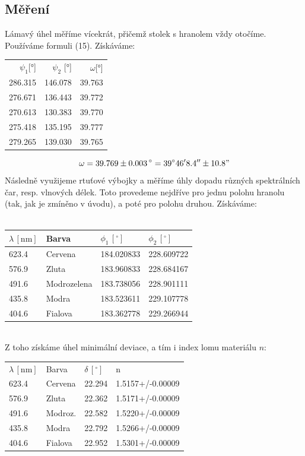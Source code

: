\documentclass[czech,11pt,a4paper]{article}
\begin{document}
\begin{multicols}{2}
	
		\section{Měření}
		Lámavý úhel měříme vícekrát, přičemž stolek s hranolem vždy otočíme. Používáme formuli (15). Získáváme:\\
		\begin{center}
			\begin{tabular}{rr|r}

			 $\psi_{1}$[°] & $\psi_{2}$ [°] & $\omega$[°] \\

			 286.315 & 146.078 & 39.763 \\
			 276.671 & 136.443 & 39.772 \\
			 270.613 & 130.383 & 39.770 \\
			 275.418 & 135.195 & 39.777 \\
			 279.265 & 139.030 & 39.765 \\

		\end{tabular}
		\end{center}
		\begin{equation}
			\omega = 39.769 \pm 0.003 \,\mathrm{^\circ} = 39^\circ 46'8.4'' \pm 10.8"
		\end{equation}
		Následně využijeme rtuťové výbojky a měříme úhly dopadu různých spektrálních čar, resp. vlnových délek. Toto provedeme nejdříve pro jednu polohu hranolu (tak, jak je zmíněno v úvodu), a poté pro polohu druhou.
		Získáváme:\\ \\
		\begin{tabular}{llll}
			$\lambda \,\mathrm{[nm]} $ & Barva       & $\phi_1 \,\mathrm{[^\circ]}$        &  $\phi_2 \,\mathrm{[^\circ]}$           \\ \hline
			623.4      & Cervena     & 184.020833 & 228.609722 \\
			576.9      & Zluta       & 183.960833 & 228.684167 \\
			491.6      & Modrozelena & 183.738056 & 228.901111 \\
			435.8      & Modra       & 183.523611 & 229.107778 \\
			404.6      & Fialova     & 183.362778 & 229.266944
		\end{tabular}\\
		Z toho získáme úhel minimální deviace, a tím i index lomu materiálu $n$:
		
		\begin{tabular}{ll|ll}
			$\lambda \,\mathrm{[nm]}$ & Barva       & $\delta\,\mathrm{[^\circ]}$     & n                 \\
			623.4        & Cervena     & 22.294 & 1.5157+/-0.00009 \\
			576.9        & Zluta       & 22.362 & 1.5171+/-0.00009 \\
			491.6        & Modroz. & 22.582 & 1.5220+/-0.00009 \\
			435.8        & Modra       & 22.792 & 1.5266+/-0.00009 \\
			404.6        & Fialova     & 22.952 & 1.5301+/-0.00009
		\end{tabular}
		

\end{multicols}
\end{document}
